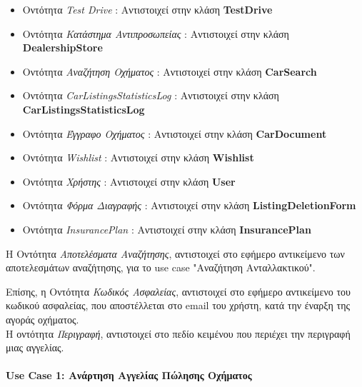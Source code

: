\documentclass{../ol-softwaremanual}
\begin{document}
\begin{itemize}
		\item Οντότητα \en \textit{Test Drive} \gr : Αντιστοιχεί στην κλάση \en \textbf{TestDrive}\gr
		\item Οντότητα \textit{Κατάστημα Αντιπροσωπείας} : Αντιστοιχεί στην κλάση \en \textbf{DealershipStore}\gr
		\item Οντότητα \textit{Αναζήτηση Οχήματος} : Αντιστοιχεί στην κλάση \en \textbf{CarSearch} \gr
		\item Οντότητα \en \textit{CarListingsStatisticsLog} \gr : Αντιστοιχεί στην κλάση \en \textbf{CarListingsStatisticsLog} \gr		
		\item Οντότητα \textit{Έγγραφο Οχήματος} : Αντιστοιχεί στην κλάση \en \textbf{CarDocument} \gr
		\item Οντότητα \en \textit{Wishlist} \gr : Αντιστοιχεί στην κλάση \en \textbf{Wishlist} \gr
		\item Οντότητα  \textit{Χρήστης} : Αντιστοιχεί στην κλάση \en \textbf{User} \gr
		\item Οντότητα \textit{Φόρμα Διαγραφής} : Αντιστοιχεί στην κλάση \en \textbf{ListingDeletionForm} \gr
		\item Οντότητα \en \textit{InsurancePlan} \gr : Αντιστοιχεί στην κλάση \en \textbf{InsurancePlan} \gr
		
	\end{itemize}
	
	Η Οντότητα \textit{Αποτελέσματα Αναζήτησης}, αντιστοιχεί στο εφήμερο αντικείμενο των αποτελεσμάτων αναζήτησης, για το \en use case "\gr Αναζήτηση Ανταλλακτικού\en"\gr.
	
	Επίσης, η Οντότητα \textit{Κωδικός Ασφαλείας}, αντιστοιχεί στο εφήμερο αντικείμενο του κωδικού ασφαλείας, που αποστέλλεται στο \en email \gr του χρήστη, κατά την έναρξη της αγοράς οχήματος. \\
	
	Η οντότητα \textit{Περιγραφή}, αντιστοιχεί στο πεδίο κειμένου που περιέχει την περιγραφή μιας αγγελίας.
	
	
	\newpage
	
	\paragraph{\en Use Case 1: \gr Ανάρτηση Αγγελίας Πώλησης Οχήματος}
	\centering
	
\end{document}
